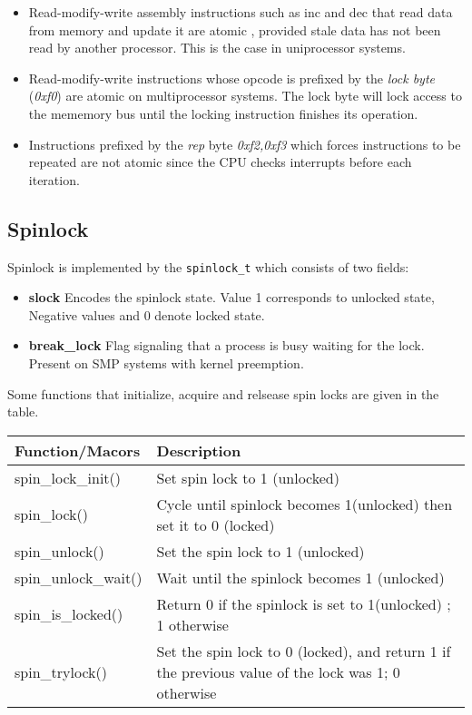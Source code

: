 \documentclass{article}
\begin{document}
\begin{itemize}
  \item Read-modify-write assembly instructions such as inc and dec
    that read data from memory and update it are atomic , provided
    stale data has not been read by another processor. This is the
    case in uniprocessor systems.

  \item Read-modify-write instructions whose opcode is prefixed by the
    \emph{lock byte} (\emph{0xf0}) are atomic on multiprocessor
    systems.  The lock byte will lock access to the mememory bus until
    the locking instruction finishes its operation.
  \item Instructions prefixed by the \emph{rep} byte \emph{0xf2,0xf3}
    which forces instructions to be repeated are not atomic since the
    CPU checks interrupts before each iteration.

\end{itemize}


\subsection{Spinlock}

Spinlock is implemented by the \lstinline{spinlock_t} which consists
of two fields:

\begin{itemize}
  \item \textbf{slock} Encodes the spinlock state. Value 1 corresponds
    to unlocked state, Negative values and 0 denote locked state.
  
  \item \textbf{break\_lock} Flag signaling that a process is busy
    waiting for the lock. Present on SMP systems with kernel
    preemption.    
\end{itemize}

Some functions that initialize, acquire and relsease spin locks are
given in the table.

  \begin{center}
  \begin{tabular}{ |l | p{7cm}| }    
    \hline
    Function/Macors & Description \\ \hline
    spin\_lock\_init() & Set spin lock to 1 (unlocked) \\
    \hline
    spin\_lock() &
    Cycle until spinlock becomes 1(unlocked) then set it to 0 (locked) \\
    \hline
    spin\_unlock() & Set the spin lock to 1 (unlocked) \\
    \hline
    spin\_unlock\_wait() & Wait until the spinlock becomes 1 (unlocked)  \\
    \hline
    spin\_is\_locked() & Return 0 if the spinlock is set to 1(unlocked) ; 1 otherwise  \\
    \hline
    spin\_trylock() &  Set the spin lock to 0 (locked), and return 1 if the previous value of the lock was 1; 0 otherwise\\
    \hline
  \end{tabular}
  \end{center}
\end{document}

